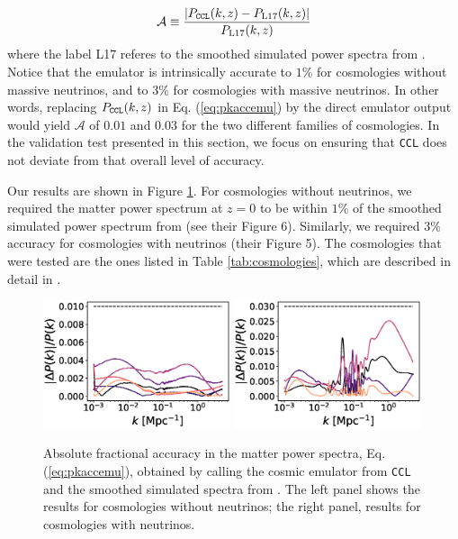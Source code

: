 \documentclass[\docopts]{\docclass}
\newcommand{\ccl}{{\tt CCL}\xspace}
\begin{document}
\begin{equation}
  \mathcal{A}\equiv\frac{|P_{\tt CCL}(k,z)-P_{\rm L17}(k,z)|}{P_{\rm L17}(k,z)}
  \label{eq:pkaccemu}
\end{equation}
where the label L17 referes to the smoothed simulated power spectra from \citet{Lawrence17}. Notice that the emulator is intrinsically accurate to $1\%$ for cosmologies without massive neutrinos, and to $3\%$ for cosmologies with massive neutrinos. In other words, replacing $P_{\tt CCL}(k,z)$ in Eq. (\ref{eq:pkaccemu}) by the direct emulator output would yield $\mathcal{A}$ of $0.01$ and $0.03$ for the two different families of cosmologies. In the validation test presented in this section, we focus on ensuring that \ccl does not deviate from that overall level of accuracy.

Our results are shown in Figure \ref{fig:emuacc}. For cosmologies without neutrinos, we required the matter power spectrum at $z=0$ to be within $1\%$ of the smoothed simulated power spectrum from \citet{Lawrence17} (see their Figure 6). Similarly, we required $3\%$ accuracy for cosmologies with neutrinos (their Figure 5). The cosmologies that were tested are the ones listed in Table \ref{tab:cosmologies}, which are described in detail in \citet{Lawrence17}.

\begin{figure}
  \centering
  \includegraphics[width=0.49\textwidth]{poweremu}
  \includegraphics[width=0.49\textwidth]{poweremu_nu}
  \caption{Absolute fractional accuracy in the matter power spectra, Eq. (\ref{eq:pkaccemu}), obtained by calling the cosmic emulator from \ccl and the smoothed simulated spectra from \citet{Lawrence17}. The left panel shows the results for cosmologies without neutrinos; the right panel, results for cosmologies with neutrinos.}
  \label{fig:emuacc}
\end{figure}
\end{document}

